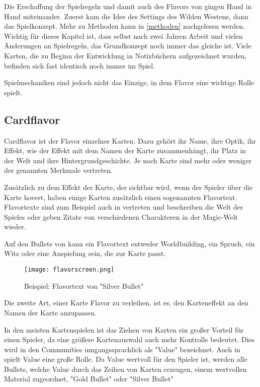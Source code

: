 Die Erschaffung der Spielregeln und damit auch des Flavors von \FF gingen Hand in Hand miteinander.
Zuerst kam die Idee des Settings des Wilden Westens, dann das Spielkonzept. Mehr zu Methoden kann in \ref{methoden}
nachgelesen werden. Wichtig für dieses Kapitel ist, dass selbst nach zwei Jahren Arbeit und vielen Änderungen an Spielregeln,
das Grundkonzept noch immer das gleiche ist. Viele Karten, die zu Beginn der Entwicklung in Notizbüchern aufgezeichnet wurden, befinden sich
fast identisch noch immer im Spiel.



Spielmechaniken sind jedoch nicht das Einzige, in dem Flavor eine wichtige Rolle spielt.

\subsection{Cardflavor}\label{subsec:cardflavor}

Cardflavor ist der Flavor einzelner Karten.
Dazu gehört ihr Name, ihre Optik, ihr Effekt, wie der Effekt mit dem Namen der Karte zusammenhängt,
ihr Platz in der Welt und ihre Hintergrundgeschichte. Je nach Karte sind mehr oder weniger der genannten
Merkmale vertreten.


Zusätzlich zu dem Effekt der Karte, der sichtbar wird, wenn der Spieler über die Karte hovert, haben einige Karten zusätzlich einen sogenannten Flavortext.
Flavortexte sind zum Beispiel auch in  vertreten und beschreiben die Welt der Spieles oder geben
Zitate von verschiedenen Charakteren in der Magic-Welt wieder.


Auf den Bullets von \FF kann ein Flavortext entweder Worldbuilding, ein Spruch, ein Witz oder eine Anspielung sein, die zur Karte passt.


\begin{figure}[H]
    \texttt{[image: flavorscreen.png]}
    \caption{Beispiel: Flavortext von "Silver Bullet"}
\end{figure}


Die zweite Art, einer Karte Flavor zu verleihen, ist es, den Karteneffekt an den Namen der Karte anzupassen.


In den meisten Kartenspielen ist das Ziehen von Karten ein großer Vorteil für einen Spieler, da eine größere Kartenauswahl
auch mehr Kontrolle bedeutet. Dies wird in den Communities umgangssprachlich als "Value" bezeichnet. 
Auch in \FF spielt Value eine große Rolle.
Da Value wertvoll für den Spieler ist, werden alle Bullets, welche Value durch das Zeihen von Karten erzeugen, einem
wertvollen Material zugeordnet, \zB "Gold Bullet" oder "Silver Bullet"

